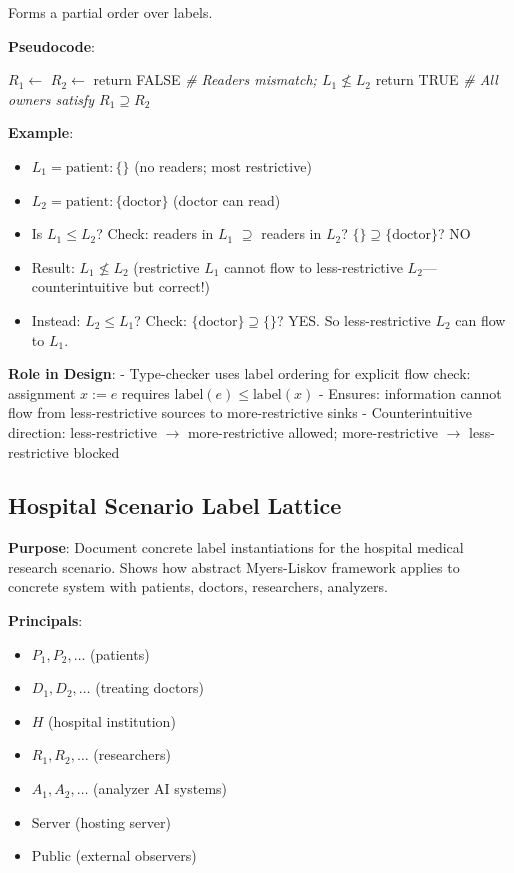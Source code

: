 Forms a partial order over labels.

\textbf{Pseudocode}:

\begin{algorithmic}
    \State $R_1 \gets$ 
    \State $R_2 \gets$ 
      \State return FALSE \textit{\# Readers mismatch; $L_1 \not\leq L_2$}
    \EndIf
  \EndFor
  \State return TRUE \textit{\# All owners satisfy $R_1 \supseteq R_2$}
\EndFunction
\end{algorithmic}

\textbf{Example}:
\begin{itemize}
\item $L_1 = \text{patient}: \{\}$ (no readers; most restrictive)
\item $L_2 = \text{patient}: \{\text{doctor}\}$ (doctor can read)
\item Is $L_1 \leq L_2$? Check: readers in $L_1$ $\supseteq$ readers in $L_2$? $\{\} \supseteq \{\text{doctor}\}$? NO
\item Result: $L_1 \not\leq L_2$ (restrictive $L_1$ cannot flow to less-restrictive $L_2$—counterintuitive but correct!)
\item Instead: $L_2 \leq L_1$? Check: $\{\text{doctor}\} \supseteq \{\}$? YES. So less-restrictive $L_2$ can flow to $L_1$.
\end{itemize}

\textbf{Role in Design}:
- Type-checker uses label ordering for explicit flow check: assignment $x := e$ requires $\text{label}(e) \leq \text{label}(x)$
- Ensures: information cannot flow from less-restrictive sources to more-restrictive sinks
- Counterintuitive direction: less-restrictive $\to$ more-restrictive allowed; more-restrictive $\to$ less-restrictive blocked

\subsection{Hospital Scenario Label Lattice}

\textbf{Purpose}: Document concrete label instantiations for the hospital medical research scenario. Shows how abstract Myers-Liskov framework applies to concrete system with patients, doctors, researchers, analyzers.

\textbf{Principals}:
\begin{itemize}
\item $P_1, P_2, \ldots$ (patients)
\item $D_1, D_2, \ldots$ (treating doctors)
\item $H$ (hospital institution)
\item $R_1, R_2, \ldots$ (researchers)
\item $A_1, A_2, \ldots$ (analyzer AI systems)
\item $\text{Server}$ (hosting server)
\item $\text{Public}$ (external observers)
\end{itemize}

